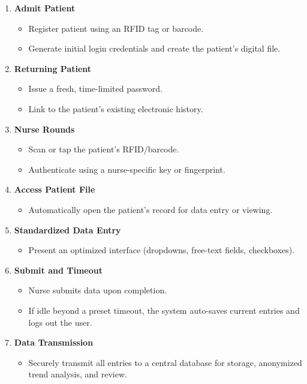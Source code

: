\documentclass[a4paper,11pt]{article}
\begin{document}
\begin{enumerate}
  \item \textbf{Admit Patient}
    \begin{itemize}
      \item Register patient using an RFID tag or barcode.
      \item Generate initial login credentials and create the patient’s digital file.
    \end{itemize}
  \item \textbf{Returning Patient}
    \begin{itemize}
      \item Issue a fresh, time-limited password.
      \item Link to the patient’s existing electronic history.
    \end{itemize}
  \item \textbf{Nurse Rounds}
    \begin{itemize}
      \item Scan or tap the patient’s RFID/barcode.
      \item Authenticate using a nurse-specific key or fingerprint.
    \end{itemize}
  \item \textbf{Access Patient File}
    \begin{itemize}
      \item Automatically open the patient’s record for data entry or viewing.
    \end{itemize}
  \item \textbf{Standardized Data Entry}
    \begin{itemize}
      \item Present an optimized interface (dropdowns, free-text fields, checkboxes).
    \end{itemize}
  \item \textbf{Submit and Timeout}
    \begin{itemize}
      \item Nurse submits data upon completion.
      \item If idle beyond a preset timeout, the system auto-saves current entries and logs out the user.
    \end{itemize}
  \item \textbf{Data Transmission}
    \begin{itemize}
      \item Securely transmit all entries to a central database for storage, anonymized trend analysis, and review.
    \end{itemize}
\end{enumerate}
\end{document}
